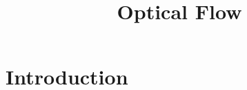 \documentclass[10pt,twocolumn,letterpaper]{article}
\begin{document}
\title{Optical Flow}


\maketitle



\section{Introduction}
\end{document}
